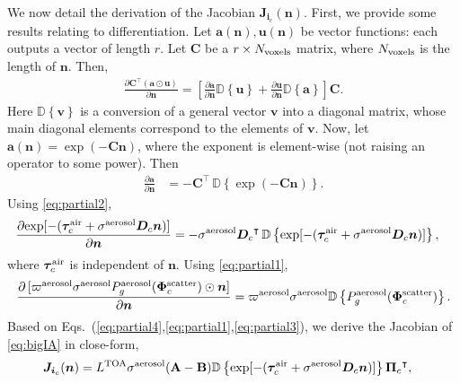 \documentclass[10pt,letterpaper]{article}
\newcommand{\abbrev}[1]{\rm{#1}}
\newcommand{\PartDeriv}[2]{\frac{\partial{#1}}{\partial{#2}}}
\newcommand{\vect}[1]{\bm{#1}}
\newcommand{\mat}[1]{\bm{#1}}
\newcommand{\transpose}[1]{{#1}^\intercal}
\newcommand{\OpDistance}{\bm{D}}
\newcommand{\OpDiag}[1]{\mathbb{D}\left\{#1\right\}}
\begin{document}
We now detail the derivation of the Jacobian ${\bm J}_{{\bm i}_c}({\bm
  n})$. First, we provide some results relating to differentiation.
Let $\vect{a}(\vect{n}),\vect{u}(\vect{n})$ be vector functions: each
outputs a vector of length $r$. Let $\mat{C}$ be a $r \times N_{\rm
  voxels}$ matrix, where $N_{\rm voxels}$ is the length of ${\bm n}$.
Then,
\begin{align}
  \label{eq:partial1}
  \PartDeriv{\transpose{\mat{C}} (\vect{a} \odot \vect{u})}{\vect{n}}
  = \left[ \PartDeriv{\vect{a}}{\vect{n}} \OpDiag{\vect{u}} +
    \PartDeriv{\vect{u}}{\vect{n}} \OpDiag{\vect{a}} \right] \mat{C}.
\end{align}
Here $\OpDiag{\vect{v}}$ is a conversion of a general vector
$\vect{v}$ into a diagonal matrix, whose main diagonal elements
correspond to the elements of $\vect{v}$. Now, let
$\vect{a}(\vect{n}) = \exp(-{\mat{C}}\vect{n})$,
where the exponent is element-wise (not raising an operator to some
power). Then
\begin{align}
  \label{eq:partial2}
  \PartDeriv{\vect{a}}{\vect{n}} &= - \transpose{\mat{C}} \,
  \OpDiag{\exp(-{\mat{C}}\vect{n})}.
\end{align}
Using \cref{eq:partial2},
\begin{align}
  \label{eq:partial4}
  \PartDeriv{\exp[-(\vect{\tau}_c^{\rm air} + {\sigma}^{\rm
      aerosol}{\bm D}_c {\bm n})]}
  {\vect{n}} &= - {\sigma}^{\rm aerosol}\transpose{\OpDistance_c} \,
  \OpDiag{\exp[-(\vect{\tau}_c^{\rm air} + {\sigma}^{\rm aerosol}{\bm
      D}_c {\bm n})]},
\end{align}
where $\vect{\tau}_c^{\rm air}$ is independent of ${\bm n}$. Using
\cref{eq:partial1},
\begin{align}
  \label{eq:partial3}
  \PartDeriv{\, [\varpi^{\rm aerosol}\sigma^{\rm aerosol} P^{\rm
      aerosol}_g(\vect{\Phi}^{\rm scatter}_c) \odot{\bm n}]}{\vect{n}}
  = \varpi^{\rm aerosol}\sigma^{\rm aerosol}\OpDiag{P^{\rm
      aerosol}_g(\vect{\Phi}^{\rm scatter}_c)}.
\end{align}
Based on Eqs.~(\ref{eq:partial4},\ref{eq:partial1},\ref{eq:partial3}),
we derive the Jacobian of \cref{eq:bigIA} in close-form,
\begin{align}
  {\bm J}_{{\bm i}_c}({\bm n}) &= L^{\rm TOA}{\sigma}^{\rm
    aerosol}({\bf A}-{\bf B}) \OpDiag{\exp[-(\vect{\tau}_c^{\rm air} +
    {\sigma}^{\rm aerosol} {\bm D}_c {\bm n})]}
  \transpose{{\vect{\Pi}}_c} ,
  \label{eq:gradient2}
\end{align}
\end{document}

